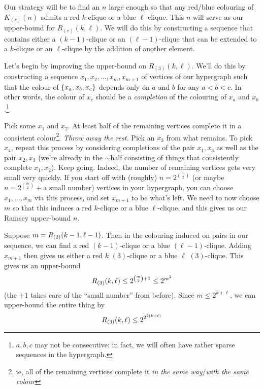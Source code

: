 Our strategy will be to find an $n$ large enough so that any red/blue colouring of $K_{(r)}(n)$ admits a red $k$-clique or a blue $\ell$-clique. This $n$ will serve as our upper-bound for $R_{(r)}(k, \ell)$. We will do this by constructing a sequence that contains either a $(k - 1)$-clique or an $(\ell - 1)$-clique that can be extended to a $k$-clique or an $\ell$-clique by the addition of another element.

Let's begin by improving the upper-bound on $R_{(3)}(k, \ell)$. We'll do this by constructing a sequence $x_1, x_2, \ldots, x_m, x_{m + 1}$ of vertices of our hypergraph such that the colour of $\left\{ x_a, x_b, x_c \right\}$ depends only on $a$ and $b$ for any $a < b < c$. In other words, the colour of $x_c$ should be a \textit{completion} of the colouring of $x_a$ and $x_b$.\footnote{$a, b, c$ may not be consecutive: in fact, we will often have rather sparse sequences in the hypergraph.}

Pick some $x_1$ and $x_2$. At least half of the remaining vertices complete it in a consistent colour\footnote{ie, all of the remaining vertices complete it \textit{in the same way}/\textit{with the same colour}}. \textit{Throw away the rest.} Pick an $x_3$ from what remains. To pick $x_4$, repeat this process by considering completions of the pair $x_1, x_3$ as well as the pair $x_2, x_3$ (we're already in the $\sim$half consisting of things that consistently complete $x_1, x_2$). Keep going. Indeed, the number of remaining vertices gets very small very quickly. If you start off with (roughly) $n = 2^{\binom{m}{2}}$ (or maybe $n = 2^{\binom{m}{2}} + \text{a small number}$) vertices in your hypergraph, you can choose $x_1, \ldots, x_m$ via this process, and set $x_{m + 1}$ to be what's left. We need to now choose $m$ so that this induces a red $k$-clique or a blue $\ell$-clique, and this gives us our Ramsey upper-bound $n$.

Suppose $m = R_{(2)}\!\left( k - 1, \ell - 1 \right)$. Then in the colouring induced on pairs in our sequence, we can find a red $(k - 1)$-clique or a blue $(\ell - 1)$-clique. Adding $x_{m + 1}$ then gives us either a red $k$ $(3)$-clique or a blue $\ell$ $(3)$-clique. This gives us an upper-bound
\begin{align*}
    R_{(3)}\!\left( k, \ell \right) \leq 2^{\binom{m}{2} + 1} \leq 2^{m^2}
\end{align*}
(the $+1$ takes care of the ``small number'' from before). Since $m \leq 2^{k + \ell}$, we can upper-bound the entire thing by
\begin{align*}
    R_{(3)}\!\left( k, \ell \right) \leq 2^{2^{2(k + \ell)}}
\end{align*}


